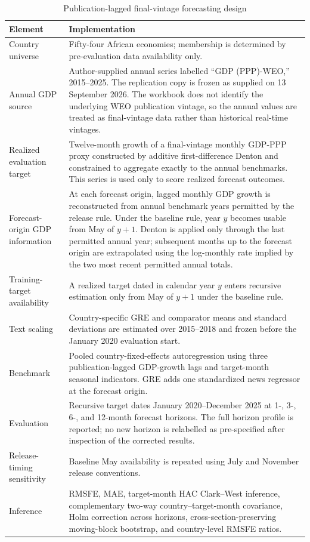 \begin{table}[htbp]
\centering\scriptsize\singlespacing
\caption{Publication-lagged final-vintage forecasting design}
\label{tab:design}
\renewcommand{\arraystretch}{0.92}
\begin{tabularx}{\textwidth}{p{}X}
\toprule
Element & Implementation \\
\midrule
Country universe & Fifty-four African economies; membership is determined by pre-evaluation data availability only. \\
Annual GDP source & Author-supplied annual series labelled ``GDP (PPP)-WEO,'' 2015--2025. The replication copy is frozen as supplied on 13 September 2026. The workbook does not identify the underlying WEO publication vintage, so the annual values are treated as final-vintage data rather than historical real-time vintages. \\
Realized evaluation target & Twelve-month growth of a final-vintage monthly GDP-PPP proxy constructed by additive first-difference Denton and constrained to aggregate exactly to the annual benchmarks. This series is used only to score realized forecast outcomes. \\
Forecast-origin GDP information & At each forecast origin, lagged monthly GDP growth is reconstructed from annual benchmark years permitted by the release rule. Under the baseline rule, year $y$ becomes usable from May of $y+1$. Denton is applied only through the last permitted annual year; subsequent months up to the forecast origin are extrapolated using the log-monthly rate implied by the two most recent permitted annual totals. \\
Training-target availability & A realized target dated in calendar year $y$ enters recursive estimation only from May of $y+1$ under the baseline rule. \\
Text scaling & Country-specific GRE and comparator means and standard deviations are estimated over 2015--2018 and frozen before the January 2020 evaluation start. \\
Benchmark & Pooled country-fixed-effects autoregression using three publication-lagged GDP-growth lags and target-month seasonal indicators. GRE adds one standardized news regressor at the forecast origin. \\
Evaluation & Recursive target dates January 2020--December 2025 at 1-, 3-, 6-, and 12-month forecast horizons. The full horizon profile is reported; no new horizon is relabelled as pre-specified after inspection of the corrected results. \\
Release-timing sensitivity & Baseline May availability is repeated using July and November release conventions. \\
Inference & RMSFE, MAE, target-month HAC Clark--West inference, complementary two-way country--target-month covariance, Holm correction across horizons, cross-section-preserving moving-block bootstrap, and country-level RMSFE ratios. \\
\bottomrule
\end{tabularx}
\end{table}
